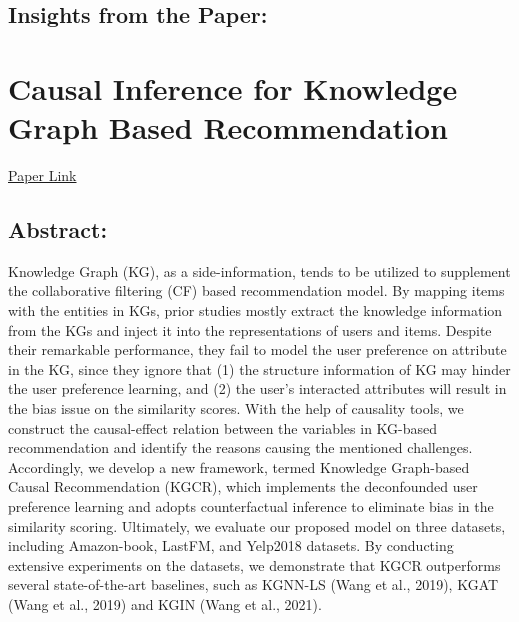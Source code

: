 \documentclass[]{report}
\begin{document}
	\section*{Insights from the Paper:}
		
	
	\chapter*{Causal Inference for Knowledge Graph Based Recommendation}
	\begin{center}
		\href{https://ieeexplore.ieee.org/document/9996555}{Paper Link}
	\end{center}
	\section*{Abstract:}
	Knowledge Graph (KG), as a side-information, tends to be utilized to supplement the collaborative filtering (CF) based recommendation model. By mapping items with the entities in KGs, prior studies mostly extract the knowledge information from the KGs and inject it into the representations of users and items. Despite their remarkable performance, they fail to model the user preference on attribute in the KG, since they ignore that (1) the structure information of KG may hinder the user preference learning, and (2) the user’s interacted attributes will result in the bias issue on the similarity scores. With the help of causality tools, we construct the causal-effect relation between the variables in KG-based recommendation and identify the reasons causing the mentioned challenges. Accordingly, we develop a new framework, termed Knowledge Graph-based Causal Recommendation (KGCR), which implements the deconfounded user preference learning and adopts counterfactual inference to eliminate bias in the similarity scoring. Ultimately, we evaluate our proposed model on three datasets, including Amazon-book, LastFM, and Yelp2018 datasets. By conducting extensive experiments on the datasets, we demonstrate	that KGCR outperforms several state-of-the-art baselines, such as 
	KGNN-LS (Wang et al., 2019), KGAT (Wang et al., 2019) and KGIN (Wang et al., 2021).
	
\end{document}
